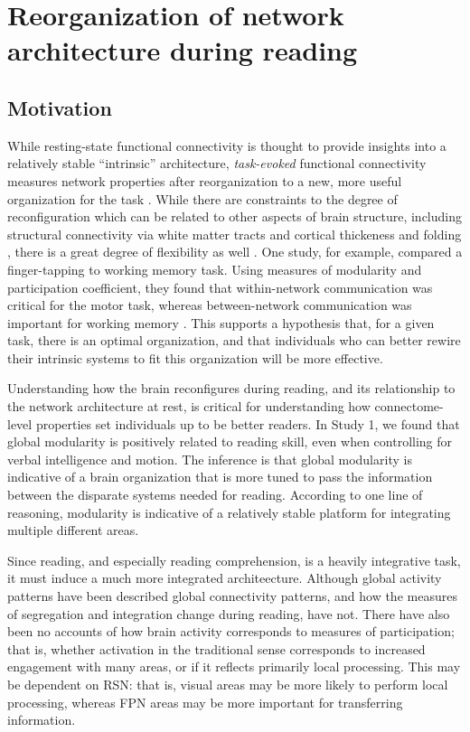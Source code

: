 \chapter{Reorganization of network architecture during reading}

\epigraph{}{}

\section{Motivation}

While resting-state functional connectivity is thought to provide insights into a relatively stable ``intrinsic'' architecture, \textit{task-evoked} functional connectivity measures network properties after reorganization to a new, more useful organization for the task \citep{Cohen2016}. While there are constraints to the degree of reconfiguration which can be related to other aspects of brain structure, including structural connectivity via white matter tracts and cortical thickeness and folding \citep{Sui2014}, there is a great degree of flexibility as well \citep{Cole2013}. One study, for example, compared a finger-tapping to working memory task. Using measures of modularity and participation coefficient, they found that within-network communication was critical for the motor task, whereas between-network communication was important for working memory \citep{Cohen2016}. This supports a hypothesis that, for a given task, there is an optimal organization, and that individuals who can better rewire their intrinsic systems to fit this organization will be more effective. 

Understanding how the brain reconfigures during reading, and its relationship to the network architecture at rest, is critical for understanding how connectome-level properties set individuals up to be better readers. In Study 1, we found that global modularity is positively related to reading skill, even when controlling for verbal intelligence and motion. The inference is that global modularity is indicative of a brain organization that is more tuned to pass the information between the disparate systems needed for reading. According to one line of reasoning, modularity is indicative of a relatively stable platform for integrating multiple different areas. 

Since reading, and especially reading comprehension, is a heavily integrative task, it must induce a much more integrated architeecture. Although global activity patterns have been described \citep{Rimrodt2009, Xu2006} global connectivity patterns, and how the measures of segregation and integration change during reading, have not. There have also been no accounts of how brain activity corresponds to measures of participation; that is, whether activation in the traditional sense corresponds to increased engagement with many areas, or if it reflects primarily local processing. This may be dependent on RSN: that is, visual areas may be more likely to perform local processing, whereas FPN areas may be more important for transferring information. 

